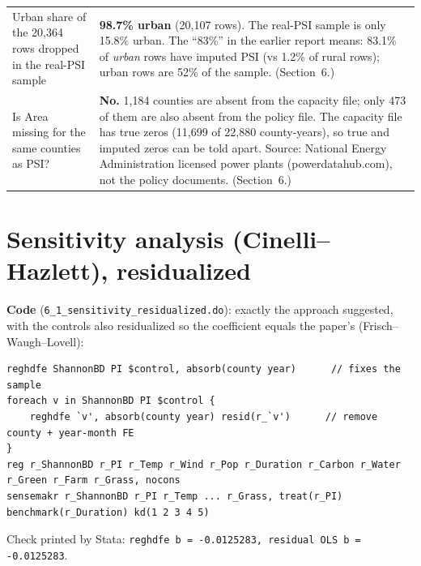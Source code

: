 \documentclass[11pt]{article}
\begin{document}
\begin{tabularx}{\linewidth}{>{\raggedright\arraybackslash}p{3.7cm} >{\raggedright\arraybackslash}X}
\addlinespace
Urban share of the 20,364 rows dropped in the real-PSI sample &
\textbf{98.7\% urban} (20,107 rows). The real-PSI sample is only 15.8\% urban. The ``83\%'' in the earlier report means: 83.1\% of \emph{urban} rows have imputed PSI (vs 1.2\% of rural rows); urban rows are 52\% of the sample. (Section~6.) \\
\addlinespace
Is Area missing for the same counties as PSI? &
\textbf{No.} 1,184 counties are absent from the capacity file; only 473 of them are also absent from the policy file. The capacity file has true zeros (11,699 of 22,880 county-years), so true and imputed zeros can be told apart. Source: National Energy Administration licensed power plants (powerdatahub.com), not the policy documents. (Section~6.) \\
\bottomrule
\end{tabularx}
\normalsize

\section{Sensitivity analysis (Cinelli--Hazlett), residualized}
\textbf{Code} (\texttt{6\_1\_sensitivity\_residualized.do}): exactly the approach suggested, with the controls also residualized so the coefficient equals the paper's (Frisch--Waugh--Lovell):
\begin{lstlisting}[numbers=none]
reghdfe ShannonBD PI $control, absorb(county year)      // fixes the sample
foreach v in ShannonBD PI $control {
    reghdfe `v', absorb(county year) resid(r_`v')      // remove county + year-month FE
}
reg r_ShannonBD r_PI r_Temp r_Wind r_Pop r_Duration r_Carbon r_Water r_Green r_Farm r_Grass, nocons
sensemakr r_ShannonBD r_PI r_Temp ... r_Grass, treat(r_PI) benchmark(r_Duration) kd(1 2 3 4 5)
\end{lstlisting}
Check printed by Stata: \texttt{reghdfe b = -0.0125283, residual OLS b = -0.0125283}.
\end{document}
